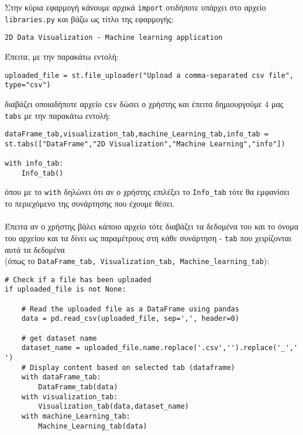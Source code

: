 \documentclass[a4paper,12pt]{article}
\begin{document}
\newpage



Στην κύρια εφαρμογή κάνουμε αρχικά \texttt{import} οτιδήποτε υπάρχει στο αρχείο \texttt{libraries.py} και βάζω ως τίτλο της εφαρμογής:
\begin{lstlisting}
2D Data Visualization - Machine learning application
\end{lstlisting}
Έπειτα, με την παρακάτω εντολή:
\begin{lstlisting}
uploaded_file = st.file_uploader("Upload a comma-separated csv file", type="csv")
\end{lstlisting}
διαβάζει οποιαδήποτε αρχείο \texttt{csv} δώσει ο χρήστης και έπειτα δημιουργούμε 4 μας \texttt{tabs} με την παρακάτω εντολή:
\\
\begin{lstlisting}
dataFrame_tab,visualization_tab,machine_Learning_tab,info_tab = st.tabs(["DataFrame","2D Visualization","Machine Learning","info"])

with info_tab:
    Info_tab()
\end{lstlisting}
όπου με το \texttt{with} δηλώνει ότι αν ο χρήστης επιλέξει το \texttt{Info\_tab} τότε θα εμφανίσει το περιεχόμενο της συνάρτησης που έχουμε θέσει.\\\\
Έπειτα αν ο χρήστης βάλει κάποιο αρχείο τότε διαβάζει τα δεδομένα του και το όνομα του αρχείου και τα δίνει ως παραμέτρους στη κάθε συνάρτηση - \texttt{tab} που χειρίζονται αυτά τα δεδομένα \\
(όπως το \texttt{DataFrame\_tab, Visualization\_tab, Machine\_learning\_tab}):
\begin{lstlisting}
# Check if a file has been uploaded
if uploaded_file is not None:

    # Read the uploaded file as a DataFrame using pandas
    data = pd.read_csv(uploaded_file, sep=',', header=0)
    
    # get dataset name
    dataset_name = uploaded_file.name.replace('.csv','').replace('_',' ')
    # Display content based on selected tab (dataframe)
    with dataFrame_tab:
        DataFrame_tab(data)
    with visualization_tab:
        Visualization_tab(data,dataset_name)
    with machine_Learning_tab:
        Machine_Learning_tab(data)
\end{lstlisting}
\end{document}
